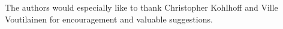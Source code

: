 The authors would especially like to thank Christopher Kohlhoff and Ville Voutilainen for
encouragement and valuable suggestions.
